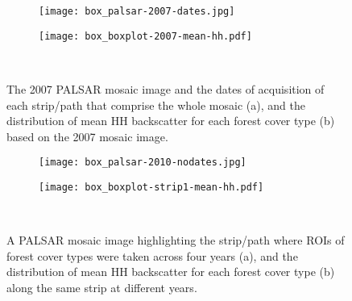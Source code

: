 \begin{figure}[!ht] \centering
	\captionsetup[subfigure]{width=2.0in} %
	\begin{subfigure}[t]{0.75\textwidth}
		\texttt{[image: box\_palsar-2007-dates.jpg]}
		\caption[Box.1]{}
		\label{box: result-box4.3a}
	\end{subfigure}
	\vspace{5pt}
	\begin{subfigure}[t]{0.75\textwidth}
		\texttt{[image: box\_boxplot-2007-mean-hh.pdf]}
		\caption[Box.1]{}
		\label{box: result-box4.3b}
	\end{subfigure}\\
	\caption[Box.1. The 2007 PALSAR mosaic image and the dates of acquisition of each strip/path that comprise the whole mosaic, and the distribution of mean HH backscatter for each forest cover type based on the 2007 mosaic image.]{The 2007 PALSAR mosaic image and the dates of acquisition of each strip/path that comprise the whole mosaic (a), and the distribution of mean HH backscatter for each forest cover type (b) based on the 2007 mosaic image.}
	\label{box: result-box4.3}
\end{figure}

\begin{figure}[!ht] \centering
	\captionsetup[subfigure]{width=2.0in} %
	\begin{subfigure}[t]{0.75\textwidth}
		\texttt{[image: box\_palsar-2010-nodates.jpg]}
		\caption[Box.2]{}
		\label{box: result-box4.4a}
	\end{subfigure}
	\vspace{5pt}
	\begin{subfigure}[t]{0.75\textwidth}
		\texttt{[image: box\_boxplot-strip1-mean-hh.pdf]}
		\caption[Box.2]{}
		\label{box: result-box4.4b}
	\end{subfigure}\\
	\caption[Box.2. A PALSAR mosaic image highlighting the strip/path where ROIs of forest cover types were taken across four years, and the distribution of mean HH backscatter for each forest cover type along the same strip at different years.]{A PALSAR mosaic image highlighting the strip/path where ROIs of forest cover types were taken across four years (a), and the distribution of mean HH backscatter for each forest cover type (b) along the same strip at different years.}
	\label{box: result-box4.4}
\end{figure}

